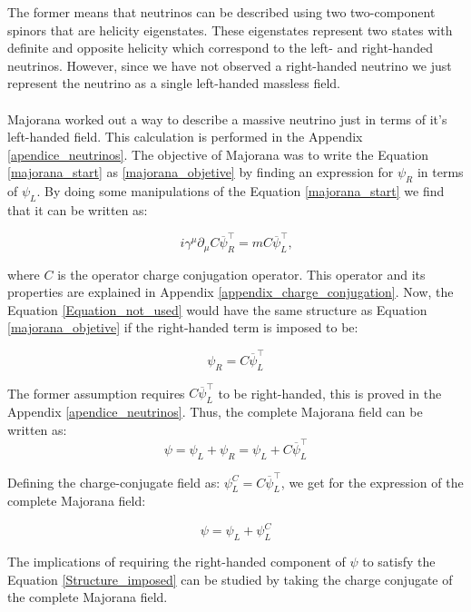 The former means that neutrinos can be described using two two-component spinors that are helicity eigenstates. These eigenstates represent two states 
with definite and opposite helicity which correspond to the left- and right-handed neutrinos. However, since we have not observed a right-handed neutrino 
we just represent the neutrino as a single left-handed massless field.  \\
\\
Majorana worked out a way to describe a massive neutrino just in terms of it's left-handed field.
This calculation is performed in the Appendix \ref{apendice_neutrinos}. The objective of Majorana was to write the Equation
\ref{majorana_start} as \ref{majorana_objetive} by finding an expression for $\psi_R$ in terms of $\psi_L$. By doing some manipulations of the Equation \ref{majorana_start} we 
find that it can be written as:  

\begin{equation} \label{Equation_not_used}
i \gamma^\mu \partial_\mu C \overline{\psi}^\intercal_R = m C \overline{\psi}^{\intercal}_L \text{,}
\end{equation}

where $C$ is the operator charge conjugation operator. This operator and its properties are explained in Appendix \ref{appendix_charge_conjugation}. Now, the Equation \ref{Equation_not_used} would have the same structure
as Equation \ref{majorana_objetive} if the right-handed term is imposed to be:

\begin{equation} 
\label{Expression_right_handed}
\psi_R = C \overline{\psi}^\intercal_L
\end{equation}

The former assumption requires $C \overline{\psi}^\intercal_L$ to be right-handed, this is proved in the Appendix \ref{apendice_neutrinos}. Thus, the complete Majorana 
field can be written as:
\begin{equation}
\psi = \psi_L + \psi_R = \psi_L + C \overline{\psi}^\intercal_L
\end{equation}

Defining the charge-conjugate field as: $\psi^C_L = C \overline{\psi}^\intercal_L$, we get for the expression of the complete Majorana field:

\begin{equation} \label{Structure_imposed}
\psi = \psi_L + \psi^C_L
\end{equation}

The implications of requiring the right-handed component of $\psi$ to satisfy the Equation                                                    \ref{Structure_imposed} can be studied by taking the charge conjugate of the complete Majorana field. 


